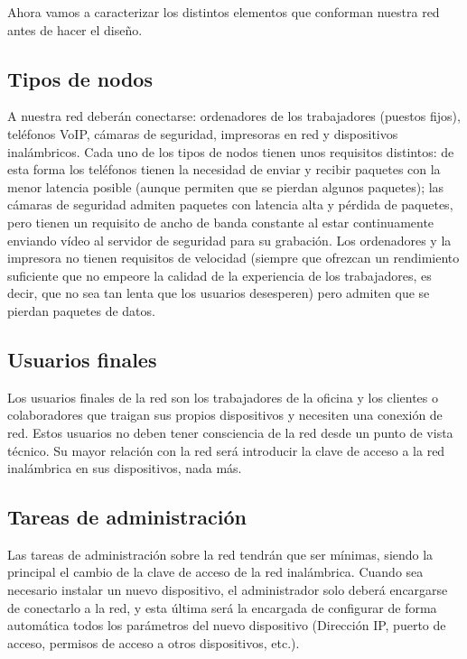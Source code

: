 Ahora vamos a caracterizar los distintos elementos que conforman nuestra red antes de hacer el diseño.

\subsection{Tipos de nodos}

A nuestra red deberán conectarse: ordenadores de los trabajadores (puestos fijos), teléfonos VoIP, cámaras de seguridad, impresoras en red y dispositivos inalámbricos. Cada uno de los tipos de nodos tienen unos requisitos distintos: de esta forma los teléfonos tienen la necesidad de enviar y recibir paquetes con la menor latencia posible (aunque permiten que se pierdan algunos paquetes); las cámaras de seguridad admiten paquetes con latencia alta y pérdida de paquetes, pero tienen un requisito de ancho de banda constante al estar continuamente enviando vídeo al servidor de seguridad para su grabación. Los ordenadores y la impresora no tienen requisitos de velocidad (siempre que ofrezcan un rendimiento suficiente que no empeore la calidad de la experiencia de los trabajadores, es decir, que no sea tan lenta que los usuarios desesperen) pero admiten que se pierdan paquetes de datos.

\subsection{Usuarios finales}

Los usuarios finales de la red son los trabajadores de la oficina y los clientes o colaboradores que traigan sus propios dispositivos y necesiten una conexión de red. Estos usuarios no deben tener consciencia de la red desde un punto de vista técnico. Su mayor relación con la red será introducir la clave de acceso a la red inalámbrica en sus dispositivos, nada más.

\subsection{Tareas de administración}

Las tareas de administración sobre la red tendrán que ser mínimas, siendo la principal el cambio de la clave de acceso de la red inalámbrica. Cuando sea necesario instalar un nuevo dispositivo, el administrador solo deberá encargarse de conectarlo a la red, y esta última será la encargada de configurar de forma automática todos los parámetros del nuevo dispositivo (Dirección IP, puerto de acceso, permisos de acceso a otros dispositivos, etc.).

